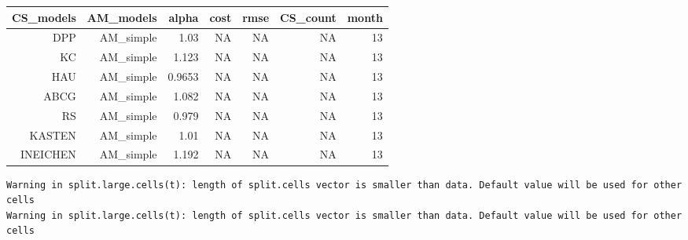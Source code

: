 \documentclass[
  10pt,
  a4paper,oneside]{article}
\begin{document}
\begin{longtable}[]{@{}rrrrrrr@{}}
\toprule\noalign{}
CS\_models & AM\_models & alpha & cost & rmse & CS\_count & month \\
\midrule\noalign{}
\endhead
\bottomrule\noalign{}
\endlastfoot
DPP & AM\_simple & 1.03 & NA & NA & NA & 13 \\
KC & AM\_simple & 1.123 & NA & NA & NA & 13 \\
HAU & AM\_simple & 0.9653 & NA & NA & NA & 13 \\
ABCG & AM\_simple & 1.082 & NA & NA & NA & 13 \\
RS & AM\_simple & 0.979 & NA & NA & NA & 13 \\
KASTEN & AM\_simple & 1.01 & NA & NA & NA & 13 \\
INEICHEN & AM\_simple & 1.192 & NA & NA & NA & 13 \\
\end{longtable}

\begin{verbatim}
Warning in split.large.cells(t): length of split.cells vector is smaller than data. Default value will be used for other cells
Warning in split.large.cells(t): length of split.cells vector is smaller than data. Default value will be used for other cells
\end{verbatim}
\end{document}
